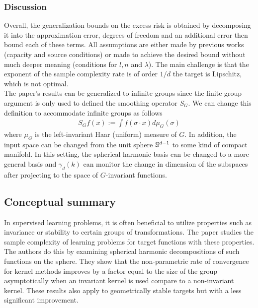 \subsubsection{Discussion}
Overall, the generalization bounds on the excess risk is obtained by decomposing it into the approximation error, degrees of freedom and an additional error then bound each of these terms. All assumptions are either made by previous works (capacity and source conditions) or made to achieve the desired bound without much deeper meaning (conditions for $l,n$ and $\lambda$). The main challenge is that the exponent of the sample complexity rate is of order $1/d$ the target is Lipschitz, which is not optimal.\\
The paper's results can be generalized to infinite groups since the finite group argument is only used to defined the smoothing operator $S_G$. We can change this definition to accommodate infinite groups as follows
\begin{align}
    S_Gf(x) := \int f(\sigma\cdot x)d\mu_G(\sigma)
\end{align}
where $\mu_G$ is the left-invariant Haar (uniform) measure of $G$. In addition, the input space can be changed from the unit sphere $\mathbb{S}^{d-1}$ to some kind of compact manifold. In this setting, the spherical harmonic basis can be changed to a more general basis and $\gamma_d(k)$ can monitor the change in dimension of the subspaces after projecting to the space of $G$-invariant functions. 

\subsection{Conceptual summary}
In supervised learning problems, it is often beneficial to utilize properties such as invariance or stability to certain groups of transformations. The paper studies the sample complexity of learning problems for target functions with these properties. The authors do this by examining spherical harmonic decompositions of such functions on the sphere. They show that the non-parametric rate of convergence for kernel methods improves by a factor equal to the size of the group asymptotically when an invariant kernel is used compare to a non-invariant kernel. These results also apply to geometrically stable targets but with a less significant improvement.
